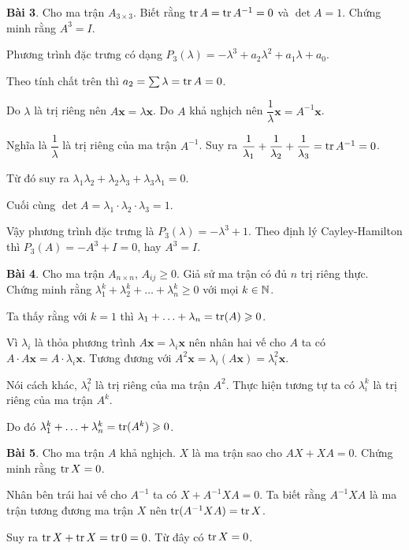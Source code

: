 \hfill

\textbf{Bài 3}. Cho ma trận $A_{3 \times 3}$. Biết rằng $\operatorname{tr} A = \operatorname{tr} A^{-1} = 0$ và $\det A = 1$. Chứng minh rằng $A^3 = I$.

Phương trình đặc trưng có dạng $P_3(\lambda) = -\lambda^3 + a_2 \lambda^2 + a_1 \lambda + a_0$.

Theo tính chất trên thì $a_2 = \sum \lambda = \operatorname{tr} A = 0$.

Do $\lambda$ là trị riêng nên $A \bm{x} = \lambda \bm{x}$. Do $A$ khả nghịch nên $\dfrac{1}{\lambda} \bm{x} = A^{-1} \bm{x}$.

Nghĩa là $\dfrac{1}{\lambda}$ là trị riêng của ma trận $A^{-1}$. Suy ra $\dfrac{1}{\lambda_1} + \dfrac{1}{\lambda_2} + \dfrac{1}{\lambda_3} = \operatorname{tr} A^{-1} = 0$.

Từ đó suy ra $\lambda_1 \lambda_2 + \lambda_2 \lambda_3 + \lambda_3 \lambda_1 = 0$.

Cuối cùng $\det A = \lambda_1 \cdot \lambda_2 \cdot \lambda_3 = 1$.

Vậy phương trình đặc trưng là $P_3(\lambda) = -\lambda^3 + 1$. Theo định lý Cayley-Hamilton thì $P_3(A) = -A^3 + I = 0$, hay $A^3 = I$.

\hfill

\textbf{Bài 4}. Cho ma trận $A_{n \times n}$, $A_{ij} \geqslant 0$. Giả sử ma trận có đủ $n$ trị riêng thực. Chứng minh rằng $\lambda_1^k + \lambda_2^k + \ldots + \lambda_n^k \geqslant 0$ với mọi $k \in \mathbb{N}$.

Ta thấy rằng với $k=1$ thì $\lambda_1 + \ldots + \lambda_n = \operatorname{tr}(A) \geqslant 0$.

Vì $\lambda_i$ là thỏa phương trình $A \bm{x} = \lambda_i \bm{x}$ nên nhân hai vế cho $A$ ta có $A \cdot A \bm{x} = A \cdot \lambda_i \bm{x}$. Tương đương với $A^2 \bm{x} = \lambda_i (A \bm{x}) = \lambda_i^2 \bm{x}$.

Nói cách khác, $\lambda_i^2$ là trị riêng của ma trận $A^2$. Thực hiện tương tự ta có $\lambda_i^k$ là trị riêng của ma trận $A^k$.

Do đó $\lambda_1^k + \ldots + \lambda_n^k = \operatorname{tr}(A^k) \geqslant 0$.

\hfill

\textbf{Bài 5}. Cho ma trận $A$ khả nghịch. $X$ là ma trận sao cho $AX + XA = 0$. Chứng minh rằng $\operatorname{tr} X = 0$.

Nhân bên trái hai vế cho $A^{-1}$ ta có $X + A^{-1} X A = 0$. Ta biết rằng $A^{-1} X A$ là ma trận tương đương ma trận $X$ nên $\operatorname{tr} (A^{-1} X A) = \operatorname{tr} X$.

Suy ra $\operatorname{tr} X + \operatorname{tr} X = \operatorname{tr} 0 = 0$. Từ đây có $\operatorname{tr} X = 0$.

